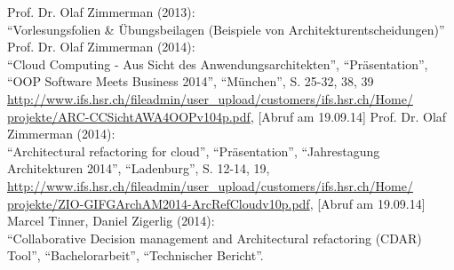 \begin{thebibliography}{literatur}
	 Prof. Dr. Olaf Zimmerman (2013): \\
		"`Vorlesungsfolien \& Übungsbeilagen (Beispiele von Architekturentscheidungen)"'
	 Prof. Dr. Olaf Zimmerman (2014): \\
		"`Cloud Computing - Aus Sicht des Anwendungsarchitekten"', "`Präsentation"', "`OOP Software Meets Business 2014"', "`München"', S. 25-32, 38, 39 \\
		\hyperlink{http://www.ifs.hsr.ch/fileadmin/user\_upload/customers/ifs.hsr.ch/Home/projekte/ARC-CCSichtAWA4OOPv104p.pdf}{http://www.ifs.hsr.ch/fileadmin/user\_upload/customers/ifs.hsr.ch/Home/ projekte/ARC-CCSichtAWA4OOPv104p.pdf}, 
		[Abruf am 19.09.14]
	 Prof. Dr. Olaf Zimmerman (2014): \\
		"`Architectural refactoring for cloud"', "`Präsentation"', "`Jahrestagung Architekturen 2014"', "`Ladenburg"', S. 12-14, 19, \\
		\hyperlink{http://www.ifs.hsr.ch/fileadmin/user\_upload/customers/ifs.hsr.ch/Home/projekte/ZIO-GIFGArchAM2014-ArcRefCloudv10p.pdf}{http://www.ifs.hsr.ch/fileadmin/user\_upload/customers/ifs.hsr.ch/Home/ projekte/ZIO-GIFGArchAM2014-ArcRefCloudv10p.pdf}, 
		[Abruf am 19.09.14]
	 Marcel Tinner, Daniel Zigerlig (2014): \\
		"`Collaborative Decision management and Architectural refactoring (CDAR) Tool"', "`Bachelorarbeit"', "`Technischer Bericht"'.
\end{thebibliography}